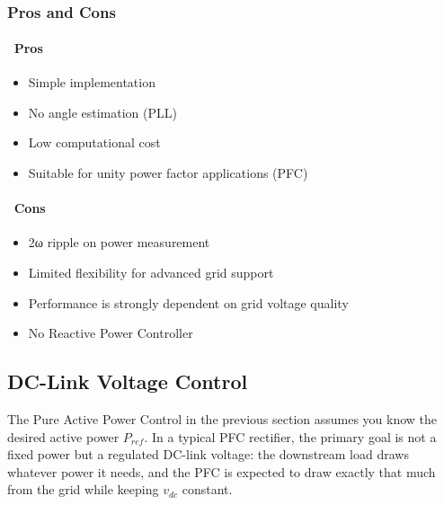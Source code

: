 \documentclass[11pt]{article}
\providecommand{\cmark}{\texorpdfstring{{\color{green!60!black}\ding{51}}\,}{[+] }}
\providecommand{\xmark}{\texorpdfstring{{\color{red}\ding{55}}\,}{[-] }}
\providecommand{\tightlist}{%
      \setlength{\itemsep}{0pt}\setlength{\parskip}{0pt}}
\begin{document}
    \begin{center}
    \end{center}
    { \hspace*{\fill} \\}
    
    \hypertarget{pros-and-cons-2}{%
\subsubsection{Pros and Cons}\label{pros-and-cons-2}}

\hypertarget{pros-3}{%
\paragraph{\cmark{} Pros}\label{pros-3}}

\begin{itemize}
\tightlist
\item
  Simple implementation
\item
  No angle estimation (PLL)
\item
  Low computational cost
\item
  Suitable for unity power factor applications (PFC)
\end{itemize}

\hypertarget{cons-3}{%
\paragraph{\xmark{} Cons}\label{cons-3}}

\begin{itemize}
\tightlist
\item
  2ω ripple on power measurement
\item
  Limited flexibility for advanced grid support
\item
  Performance is strongly dependent on grid voltage quality
\item
  No Reactive Power Controller
\end{itemize}

    \hypertarget{dc-link-voltage-control}{%
\subsection{DC-Link Voltage Control}\label{dc-link-voltage-control}}

    The Pure Active Power Control in the previous section assumes you know
the desired active power \(P_{ref}\). In a typical PFC rectifier, the
primary goal is not a fixed power but a regulated DC-link voltage: the
downstream load draws whatever power it needs, and the PFC is expected
to draw exactly that much from the grid while keeping \(v_{dc}\)
constant.
\end{document}
